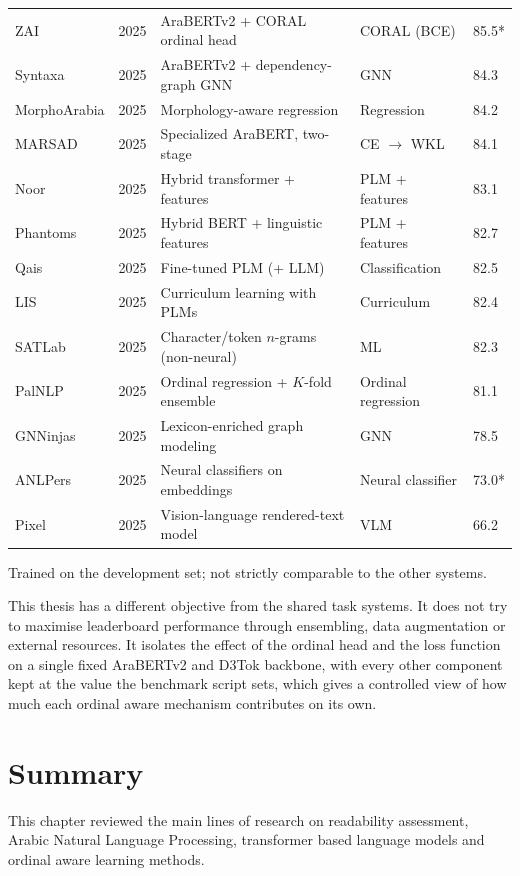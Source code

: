 \documentclass[12pt]{report}
\begin{document}
\begin{table}[H]
\begin{tabular}{p{2.4cm} p{0.8cm} p{4.8cm} p{2.2cm} p{1.2cm}}
ZAI & 2025 & AraBERTv2 + CORAL ordinal head & CORAL (BCE) & 85.5* \\
Syntaxa & 2025 & AraBERTv2 + dependency-graph GNN & GNN & 84.3 \\
MorphoArabia & 2025 & Morphology-aware regression & Regression & 84.2 \\
MARSAD & 2025 & Specialized AraBERT, two-stage & CE $\rightarrow$ WKL & 84.1 \\
Noor & 2025 & Hybrid transformer + features & PLM + features & 83.1 \\
Phantoms & 2025 & Hybrid BERT + linguistic features & PLM + features & 82.7 \\
Qais & 2025 & Fine-tuned PLM (+ LLM) & Classification & 82.5 \\
LIS & 2025 & Curriculum learning with PLMs & Curriculum & 82.4 \\
SATLab & 2025 & Character/token $n$-grams (non-neural) & ML & 82.3 \\
PalNLP & 2025 & Ordinal regression + $K$-fold ensemble & Ordinal regression & 81.1 \\
GNNinjas & 2025 & Lexicon-enriched graph modeling & GNN & 78.5 \\
ANLPers & 2025 & Neural classifiers on embeddings & Neural classifier & 73.0* \\
Pixel & 2025 & Vision-language rendered-text model & VLM & 66.2 \\
\bottomrule
\end{tabular}

\vspace{0.15cm}
{\footnotesize * Trained on the development set; not strictly comparable to the other systems.}
\end{table}

This thesis has a different objective from the shared task systems. It does not try to maximise leaderboard performance through ensembling, data augmentation or external resources. It isolates the effect of the ordinal head and the loss function on a single fixed AraBERTv2 and D3Tok backbone, with every other component kept at the value the benchmark script sets, which gives a controlled view of how much each ordinal aware mechanism contributes on its own.

\section{Summary}

This chapter reviewed the main lines of research on readability assessment, Arabic Natural Language Processing, transformer based language models and ordinal aware learning methods.
\end{document}
